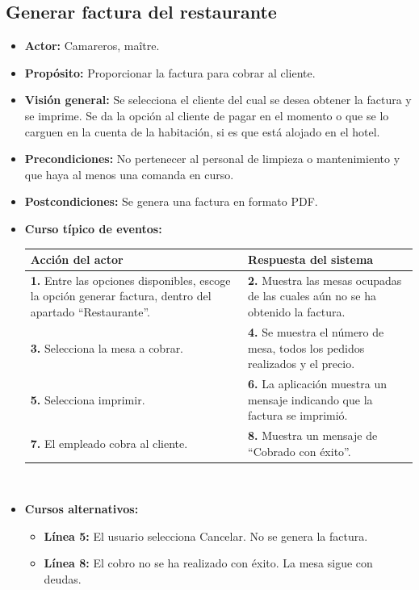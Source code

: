 \documentclass[spanish,a4paper,11pt, twoside]{report}	%
\begin{document}

		\subsection{Generar factura del restaurante}
			\begin{itemize}
			\item \textbf{Actor:} Camareros, maître.
			\item \textbf{Propósito: } Proporcionar la factura para cobrar al cliente.
			\item \textbf{Visión general:} Se selecciona el cliente del cual se desea obtener la factura y se imprime. Se da la opción al cliente de pagar en el momento o que se lo carguen en la cuenta de la habitación, si es que está alojado en el hotel.
			\item \textbf{Precondiciones:} No pertenecer al personal de limpieza o mantenimiento y que haya al menos una comanda en curso.
			\item \textbf{Postcondiciones:} Se genera una factura en formato PDF.
			\item \textbf{Curso típico de eventos:} 	\\
				\begin{tabular}{|p{6cm}||p{6cm}|}
				\hline
				\textbf{Acción del actor} & \textbf{Respuesta del sistema} \\ \hline \hline
				\textbf{1.} Entre las opciones disponibles, escoge la opción generar factura, 
					dentro del apartado ``Restaurante''. & 
				\textbf{2.} Muestra las mesas ocupadas de las cuales aún no se ha obtenido la factura. \\ \hline
				\textbf{3.} Selecciona la mesa a cobrar.	& 
				\textbf{4.} Se muestra el número de mesa, todos los pedidos realizados y el precio. \\ \hline
				\textbf{5.} Selecciona imprimir.	& 
				\textbf{6.} La aplicación muestra un mensaje indicando que la factura se imprimió. \\ \hline
				\textbf{7.} El empleado cobra al cliente.	& 
				\textbf{8.} Muestra un mensaje de ``Cobrado con éxito''. \\ \hline
			\end{tabular}
			\\
			\item \textbf{Cursos alternativos:} 
			\begin{itemize}
			\item  \textbf{Línea 5:} El usuario selecciona Cancelar. No se genera la factura.
			\item  \textbf{Línea 8:} El cobro no se ha realizado con éxito. La mesa sigue con deudas.
			\end {itemize}
		\end {itemize}
		
\end{document}
